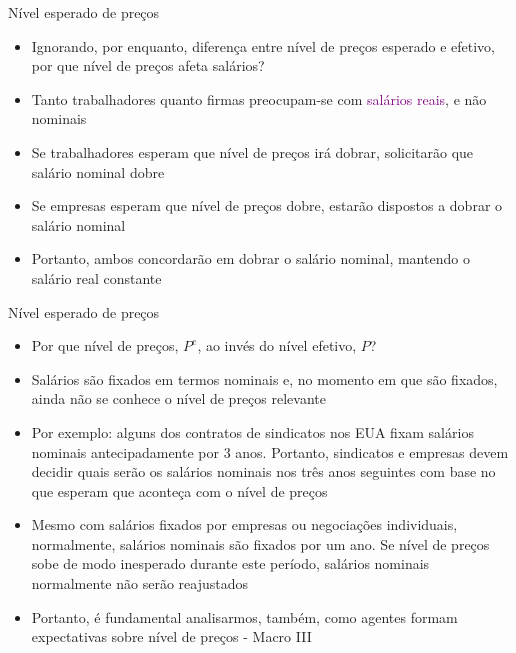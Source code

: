 \documentclass[10pt]{beamer}
\begin{document}
\begin{frame}
    {Nível esperado de preços}
    \begin{itemize}
        \item Ignorando, por enquanto, diferença entre nível de preços esperado e efetivo, por que nível de preços afeta salários?\bigskip
        \item Tanto trabalhadores quanto firmas preocupam-se com \textcolor{purple}{salários reais}, e não nominais\bigskip
        \item Se trabalhadores esperam que nível de preços irá dobrar, solicitarão que salário nominal dobre\bigskip
        \item Se empresas esperam que nível de preços dobre, estarão dispostos a dobrar o salário nominal\bigskip
        \item Portanto, ambos concordarão em dobrar o salário nominal, mantendo o salário real constante
    \end{itemize}
\end{frame}

\begin{frame}
    {Nível esperado de preços}
    \begin{itemize}
        \item Por que nível  de preços, $P^e$, ao invés do nível efetivo, $P$?\bigskip
        \item Salários são fixados em termos nominais e, no momento em que são fixados, ainda não se conhece o nível de preços relevante\bigskip
        \item Por exemplo: alguns dos contratos de sindicatos nos EUA fixam salários nominais antecipadamente por 3 anos. Portanto, sindicatos e empresas devem decidir quais serão os salários nominais nos três anos seguintes com base no que esperam que aconteça com o nível de preços\bigskip
        \item Mesmo com salários fixados por empresas ou negociações individuais, normalmente, salários nominais são fixados por um ano. Se nível de preços sobe de modo inesperado durante este período, salários nominais normalmente não serão reajustados\bigskip
        \item Portanto, é fundamental analisarmos, também, como agentes formam expectativas sobre nível de preços - Macro III
    \end{itemize}
\end{frame}
\end{document}
